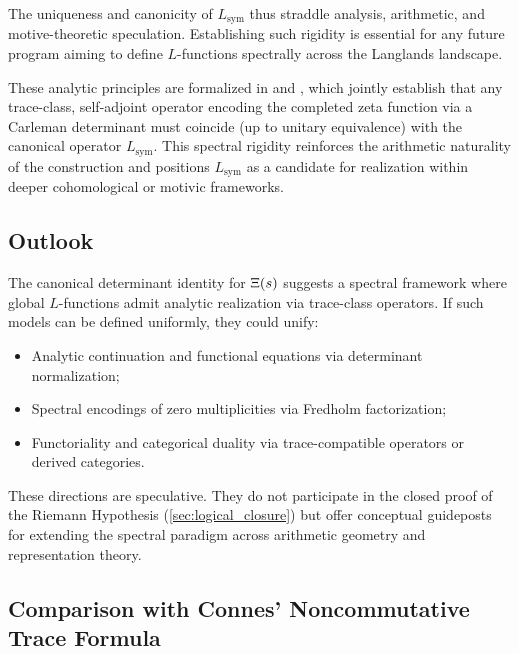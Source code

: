 The uniqueness and canonicity of \( L_{\mathrm{sym}} \) thus straddle analysis, arithmetic, and motive-theoretic speculation. Establishing such rigidity is essential for any future program aiming to define \( L \)-functions spectrally across the Langlands landscape.

These analytic principles are formalized in  and , which jointly establish that any trace-class, self-adjoint operator encoding the completed zeta function via a Carleman determinant must coincide (up to unitary equivalence) with the canonical operator \( L_{\mathrm{sym}} \). This spectral rigidity reinforces the arithmetic naturality of the construction and positions \( L_{\mathrm{sym}} \) as a candidate for realization within deeper cohomological or motivic frameworks.

\subsection*{Outlook}

The canonical determinant identity for \( \Xi(s) \) suggests a spectral framework where global \( L \)-functions admit analytic realization via trace-class operators. If such models can be defined uniformly, they could unify:

\begin{itemize}
  \item Analytic continuation and functional equations via determinant normalization;
  \item Spectral encodings of zero multiplicities via Fredholm factorization;
  \item Functoriality and categorical duality via trace-compatible operators or derived categories.
\end{itemize}

These directions are speculative. They do not participate in the closed proof of the Riemann Hypothesis (\cref{sec:logical_closure}) but offer conceptual guideposts for extending the spectral paradigm across arithmetic geometry and representation theory.

\subsection*{Comparison with Connes’ Noncommutative Trace Formula}

